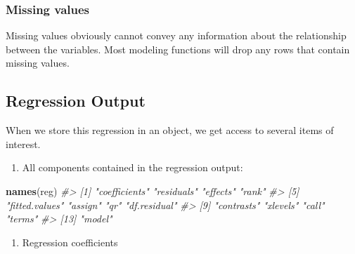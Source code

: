 \documentclass[]{book}
\newenvironment{Shaded}{\begin{snugshade}}{\end{snugshade}}
\newcommand{\KeywordTok}[1]{\textcolor[rgb]{0.13,0.29,0.53}{\textbf{#1}}}
\newcommand{\CommentTok}[1]{\textcolor[rgb]{0.56,0.35,0.01}{\textit{#1}}}
\newcommand{\OperatorTok}[1]{\textcolor[rgb]{0.81,0.36,0.00}{\textbf{#1}}}
\newcommand{\NormalTok}[1]{#1}
\providecommand{\tightlist}{%
  \setlength{\itemsep}{0pt}\setlength{\parskip}{0pt}}
\begin{document}
\subsubsection*{Missing values}\label{missing-values}

Missing values obviously cannot convey any information about the
relationship between the variables. Most modeling functions will drop
any rows that contain missing values.

\subsection{Regression Output}\label{regression-output}

When we store this regression in an object, we get access to several
items of interest.

\begin{enumerate}
\def\labelenumi{\arabic{enumi}.}
\tightlist
\item
  All components contained in the regression output:
\end{enumerate}

\begin{Shaded}
\begin{Highlighting}[]
\KeywordTok{names}\NormalTok{(reg)}
\CommentTok{#>  [1] "coefficients"  "residuals"     "effects"       "rank"         }
\CommentTok{#>  [5] "fitted.values" "assign"        "qr"            "df.residual"  }
\CommentTok{#>  [9] "contrasts"     "xlevels"       "call"          "terms"        }
\CommentTok{#> [13] "model"}
\end{Highlighting}
\end{Shaded}

\begin{enumerate}
\def\labelenumi{\arabic{enumi}.}
\setcounter{enumi}{1}
\tightlist
\item
  Regression coefficients
\end{enumerate}

\begin{Shaded}
\end{Shaded}
\end{document}
